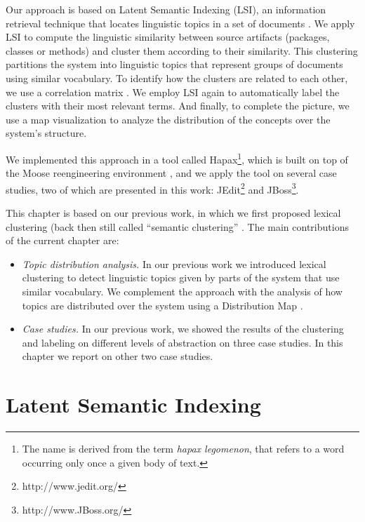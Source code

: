 Our approach is based on Latent Semantic Indexing (LSI), an information retrieval technique that locates linguistic topics in a set of documents \cite{Deer90a,Marc04a}. We apply LSI to compute the linguistic similarity between source artifacts (\eg packages, classes or methods) and cluster them according to their similarity. This clustering partitions the system into linguistic topics that represent groups of documents using similar vocabulary. To identify how the clusters are related to each other, we use a correlation matrix \cite{Ling73a}. We employ LSI again to automatically label the clusters with their most relevant terms. And finally, to complete the picture, we use a map visualization to analyze the distribution of the concepts over the system's structure.

We implemented this approach in a tool called Hapax\footnote{The name is derived from the term \emph{hapax legomenon}, that refers to a word occurring only once a given body of text.}, which is built on top of the Moose reengineering environment \cite{Duca05a,Nier05c}, and we apply the tool on several case studies, two of which are presented in this work: JEdit\footnote{http://www.jedit.org/} and JBoss\footnote{http://www.JBoss.org/}.

This chapter is based on our previous work, in which we first proposed lexical clustering (back then still called ``semantic clustering'' \cite{Kuhn05a}. The main contributions of the current chapter are:
\begin{itemize}

\item \emph{Topic distribution analysis.} In our previous work we introduced lexical clustering to detect linguistic topics given by parts of the system that use similar vocabulary. We complement the approach with the analysis of how topics are distributed over the system using a Distribution Map \cite{Duca06c}.

\item \emph{Case studies.} In our previous work, we showed the results of the clustering and labeling on different levels of abstraction on three case studies. In this chapter we report on other two case studies.
\end{itemize}

\section{Latent Semantic Indexing}\label{sec:LSI}

